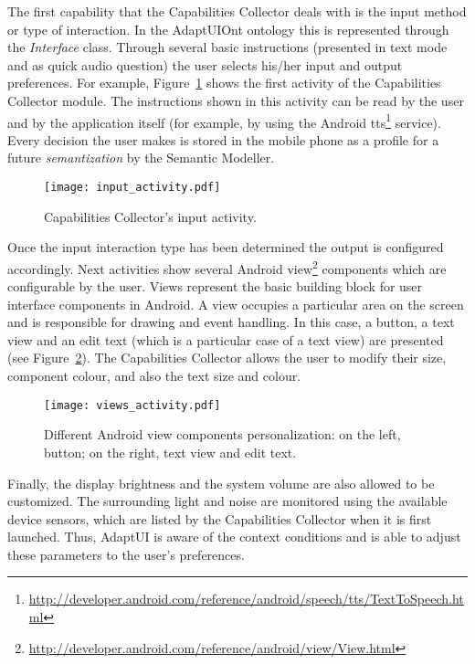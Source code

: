 The first capability that the Capabilities Collector deals with is the input
method or type of interaction. In the AdaptUIOnt ontology this is represented
through the \textit{Interface} class. Through several basic instructions
(presented in text mode and as quick audio question) the user selects his/her
input and output preferences. For example, Figure~\ref{fig:input_activity} shows
the first activity of the Capabilities Collector module. The instructions shown
in this activity can be read by the user and by the application itself (for
example, by using the Android \ac{tts}\footnote{\url{http://developer.android.com/reference/android/speech/tts/TextToSpeech.html}} service). Every decision
the user makes is stored in the mobile phone as a profile for a future
\textit{semantization} by the Semantic Modeller.

\begin{figure}
\centering
\texttt{[image: input\_activity.pdf]}
\caption{Capabilities Collector's input activity.}
\label{fig:input_activity}
\end{figure}

Once the input interaction type has been determined the output is configured 
accordingly. Next activities show several Android view\footnote{\url{http://developer.android.com/reference/android/view/View.html}} 
components which are configurable by the user. Views represent the basic 
building block for user interface components in Android. A view occupies a 
particular area on the screen and is responsible for drawing and event 
handling. In this case, a button, a text view and an 
edit text (which is a particular case of a text view) are presented (see 
Figure~\ref{fig:views_activity}). The Capabilities Collector allows the user to 
modify their size, component colour, and also the text size and colour.

\begin{figure}
\centering
\texttt{[image: views\_activity.pdf]}
\caption{Different Android view components
personalization: on the left, button; on the right, text view and edit text.}
\label{fig:views_activity}
\end{figure}

Finally, the display brightness and the system volume are also allowed to be
customized. The surrounding light and noise are monitored using the available
device sensors, which are listed by the Capabilities Collector when it is first
launched. Thus, AdaptUI is aware of the context conditions and is able to adjust
these parameters to the user's preferences.

